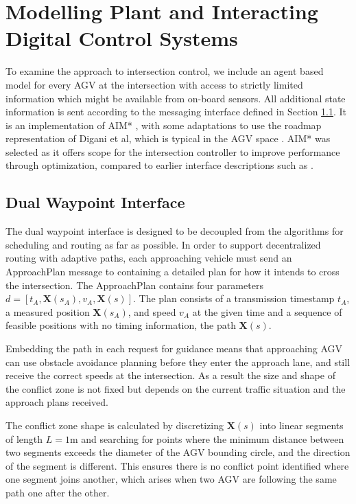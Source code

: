 \section{Modelling Plant and Interacting Digital Control Systems}
To examine the approach to intersection control, we include an agent based model for every AGV at the intersection with access to strictly limited information which might be available from on-board sensors. All additional state information is sent according to the messaging interface defined in Section \ref{sec:dual_waypoint}. It is an implementation of AIM* \cite{Levin2017}, with some adaptations to use the roadmap representation of Digani et al, which is typical in the AGV space \cite{Digani2019}. AIM* was selected as it offers scope for the intersection controller to improve performance through optimization, compared to earlier interface descriptions such as \cite{Dresner2004}.  
\subsection{Dual Waypoint Interface}
\label{sec:dual_waypoint}
The dual waypoint interface is designed to be decoupled from the algorithms for scheduling and routing as far as possible. In order to support decentralized routing with adaptive paths, each approaching vehicle must send an ApproachPlan message to containing a detailed plan for how it intends to cross the intersection.  The ApproachPlan contains four parameters $d =\left[ t_A, \bm{X}( s_A ), v_A, \bm{X}(s) \right]$. The plan consists of a transmission timestamp $t_A$, a measured position $\bm{X}(s_A)$, and speed $v_A$ at the given time and a sequence of feasible positions with no timing information, the path $\bm{X}(s)$. 

Embedding the path in each request for guidance means that approaching AGV can use obstacle avoidance planning before they enter the approach lane, and still receive the correct speeds at the intersection. As a result the size and shape of the conflict zone is not fixed but depends on the current traffic situation and the approach plans received.

The conflict zone shape is calculated by discretizing $\bm{X}(s)$ into linear segments of length $L=1$m and searching for points where the minimum distance between two segments exceeds the diameter of the AGV bounding circle, and the direction of the segment is different. This ensures there is no conflict point identified where one segment joins another, which arises when two AGV are following the same path one after the other.  

